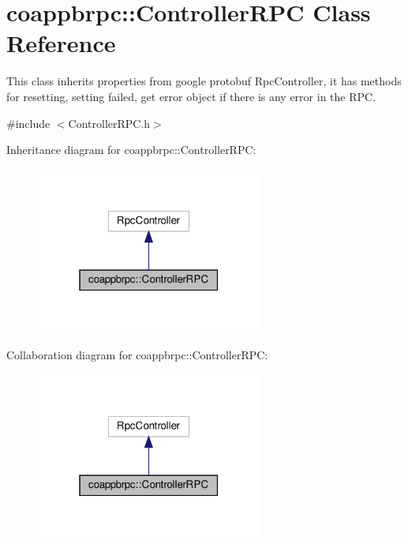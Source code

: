 \hypertarget{classcoappbrpc_1_1ControllerRPC}{}\section{coappbrpc\+:\+:Controller\+R\+PC Class Reference}
\label{classcoappbrpc_1_1ControllerRPC}


This class inherits properties from google protobuf Rpc\+Controller, it has methods for resetting, setting failed, get error object if there is any error in the R\+PC.  




{\ttfamily \#include $<$Controller\+R\+P\+C.\+h$>$}



Inheritance diagram for coappbrpc\+:\+:Controller\+R\+PC\+:\nopagebreak
\begin{figure}[H]
\begin{center}
\leavevmode
\includegraphics[width=211pt]{classcoappbrpc_1_1ControllerRPC__inherit__graph}
\end{center}
\end{figure}


Collaboration diagram for coappbrpc\+:\+:Controller\+R\+PC\+:\nopagebreak
\begin{figure}[H]
\begin{center}
\leavevmode
\includegraphics[width=211pt]{classcoappbrpc_1_1ControllerRPC__coll__graph}
\end{center}
\end{figure}
